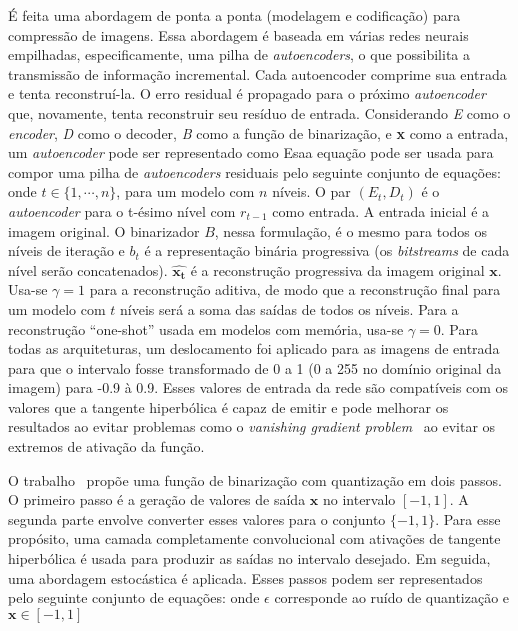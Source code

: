 É feita uma abordagem de ponta a ponta (modelagem e codificação) para compressão de imagens. Essa abordagem é baseada em várias redes neurais empilhadas, especificamente, uma pilha de \textit{autoencoders}, o que possibilita a transmissão de informação incremental. Cada autoencoder comprime sua entrada e tenta reconstruí-la. O erro residual é propagado para o próximo \textit{autoencoder} que, novamente, tenta reconstruir seu resíduo de entrada. Considerando \textit{E} como o \textit{encoder}, \textit{D} como o decoder, \textit{B} como a função de binarização, e \textbf{x} como a entrada, um \textit{autoencoder} pode ser representado como 
Esaa equação pode ser usada para compor uma pilha de \textit{autoencoders} residuais pelo seguinte conjunto de equações:
onde $t \in \{1,\cdots,n\}$, para um modelo com $n$ níveis. O par $(E_t, D_t)$ é o \textit{autoencoder} para o t-ésimo nível com $r_{t-1}$ como entrada. A entrada inicial é a imagem original. O binarizador $B$, nessa formulação, é o mesmo para todos os níveis de iteração e $b_t$ é a representação binária progressiva (os \textit{bitstreams} de cada nível serão concatenados). $\hat{\mathbf{x_t}}$ é a reconstrução progressiva da imagem original $\mathbf{x}$. Usa-se $\gamma = 1$ para a reconstrução aditiva, de modo que a reconstrução final para um modelo com $t$ níveis será a soma das saídas de todos os níveis. Para a reconstrução ``one-shot'' usada em modelos com memória, usa-se $\gamma = 0$. Para todas as arquiteturas, um deslocamento foi aplicado para as imagens de entrada para que o intervalo fosse transformado de 0 a 1 (0 a 255 no domínio original da imagem) para -0.9 à 0.9. Esses valores de entrada da rede são compatíveis com os valores que a tangente hiperbólica é capaz de emitir e pode melhorar os resultados ao evitar problemas como o \textit{vanishing gradient problem}~\cite{dlbook} ao evitar os extremos de ativação da função.

O trabalho~\cite{toderici2016} propõe uma função de binarização com quantização em dois passos. O primeiro passo é a geração de valores de saída $\mathbf{x}$ no intervalo $[-1, 1]$. A segunda parte envolve converter esses valores para o conjunto $\{-1, 1\}$. Para esse propósito, uma camada completamente convolucional com ativações de tangente hiperbólica é usada para produzir as saídas no intervalo desejado. Em seguida, uma abordagem estocástica é aplicada. Esses passos podem ser representados pelo seguinte conjunto de equações:   onde $\epsilon$ corresponde ao ruído de quantização e $\mathbf{x} \in [-1, 1]$
    
